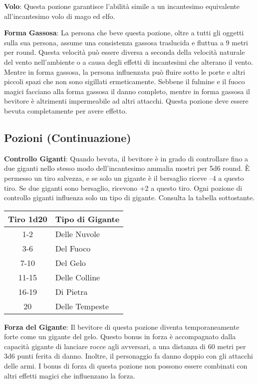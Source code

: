 \documentclass{article}
\begin{document}
\begin{multicols}{2}
\textbf{Volo}: Questa pozione garantisce l'abilità simile a un incantesimo equivalente all'incantesimo volo di mago ed elfo.

\textbf{Forma Gassosa}: La persona che beve questa pozione, oltre a tutti gli oggetti sulla sua persona, assume una consistenza gassosa traslucida e fluttua a 9 metri per round. Questa velocità può essere diversa a seconda della velocità naturale del vento nell'ambiente o a causa degli effetti di incantesimi che alterano il vento. Mentre in forma gassosa, la persona influenzata può fluire sotto le porte e altri piccoli spazi che non sono sigillati ermeticamente. Sebbene il fulmine e il fuoco magici facciano alla forma gassosa il danno completo, mentre in forma gassosa il bevitore è altrimenti impermeabile ad altri attacchi. Questa pozione deve essere bevuta completamente per avere effetto.

\subsection{Pozioni (Continuazione)}

\textbf{Controllo Giganti}: Quando bevuta, il bevitore è in grado di controllare fino a due giganti nello stesso modo dell'incantesimo ammalia mostri per 5d6 round. È permesso un tiro salvezza, e se solo un gigante è il bersaglio riceve –4 a questo tiro. Se due giganti sono bersaglio, ricevono +2 a questo tiro. Ogni pozione di controllo giganti influenza solo un tipo di gigante. Consulta la tabella sottostante.

\begin{table}[h]
\centering
\begin{tabular}{|c|l|}
\hline
\textbf{Tiro 1d20} & \textbf{Tipo di Gigante} \\
\hline
1-2 & Delle Nuvole \\
3-6 & Del Fuoco \\
7-10 & Del Gelo \\
11-15 & Delle Colline \\
16-19 & Di Pietra \\
20 & Delle Tempeste \\
\hline
\end{tabular}

\end{table}

\textbf{Forza del Gigante}: Il bevitore di questa pozione diventa temporaneamente forte come un gigante del gelo. Questo bonus in forza è accompagnato dalla capacità gigante di lanciare rocce agli avversari, a una distanza di 60 metri per 3d6 punti ferita di danno. Inoltre, il personaggio fa danno doppio con gli attacchi delle armi. I bonus di forza di questa pozione non possono essere combinati con altri effetti magici che influenzano la forza.


\end{multicols}
\end{document}
